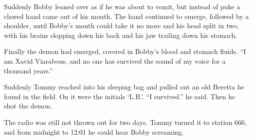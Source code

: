 Suddenly Bobby leaned over as if he was about to vomit, but instead
of puke a clawed hand came out of his mouth. The hand continued to
emerge, followed by a shoulder, until Bobby's mouth could
take it no more and his head split in two, with his brains slopping
down his back and his jaw trailing down his stomach.



Finally the demon had emerged, covered in Bobby's blood and
stomach fluids. ``I am Xavid Viarabous, and no one has
survived the sound of my voice for a thousand years.''



Suddenly Tommy reached into his sleeping bag and pulled out an old
Beretta he found in the field. On it were the initials
`L.B.'. ``I survived.'' he said. Then he shot
the demon.



The radio was still not thrown out for two days. Tommy turned it to
station 666, and from midnight to 12:01 he could hear Bobby
screaming. 
 






